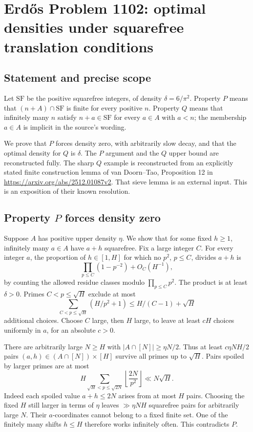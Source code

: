 \section*{Erd\H{o}s Problem 1102: optimal densities under squarefree translation conditions}
\subsection*{Statement and precise scope}
Let $\mathrm{SF}$ be the positive squarefree integers, of density $\delta=6/\pi^2$. Property $P$ means that $(n+A)\cap\mathrm{SF}$ is finite for every positive $n$. Property $Q$ means that infinitely many $n$ satisfy $n+a\in\mathrm{SF}$ for every $a\in A$ with $a<n$; the membership $a\in A$ is implicit in the source's wording.

We prove that $P$ forces density zero, with arbitrarily slow decay, and that the optimal density for $Q$ is $\delta$. The $P$ argument and the $Q$ upper bound are reconstructed fully. The sharp $Q$ example is reconstructed from an explicitly stated finite construction lemma of van Doorn--Tao, Proposition 12 in \url{https://arxiv.org/abs/2512.01087v2}. That sieve lemma is an external input. This is an exposition of their known resolution.

\subsection*{Property $P$ forces density zero}
Suppose $A$ has positive upper density $\eta$. We show that for some fixed $h\ge1$, infinitely many $a\in A$ have $a+h$ squarefree.
Fix a large integer $C$. For every integer $a$, the proportion of $h\in[1,H]$ for which no $p^2$, $p\le C$, divides $a+h$ is
\[
 \prod_{p\le C}(1-p^{-2})+O_C(H^{-1}),
\]
by counting the allowed residue classes modulo $\prod_{p\le C}p^2$. The product is at least $\delta>0$. Primes $C<p\le\sqrt H$ exclude at most
\[
 \sum_{C<p\le\sqrt H}(H/p^2+1)\le H/(C-1)+\sqrt H
\]
additional choices. Choose $C$ large, then $H$ large, to leave at least $cH$ choices uniformly in $a$, for an absolute $c>0$.

There are arbitrarily large $N\ge H$ with $|A\cap[N]|\ge\eta N/2$. Thus at least $c\eta NH/2$ pairs $(a,h)\in(A\cap[N])\times[H]$ survive all primes up to $\sqrt H$. Pairs spoiled by larger primes are at most
\[
 H\sum_{\sqrt H<p\le\sqrt{2N}}\left\lfloor\frac{2N}{p^2}\right\rfloor
 \ll N\sqrt H.
\]
Indeed each spoiled value $a+h\le2N$ arises from at most $H$ pairs. Choosing the fixed $H$ still larger in terms of $\eta$ leaves $\gg\eta NH$ squarefree pairs for arbitrarily large $N$. Their $a$-coordinates cannot belong to a fixed finite set. One of the finitely many shifts $h\le H$ therefore works infinitely often. This contradicts $P$.


